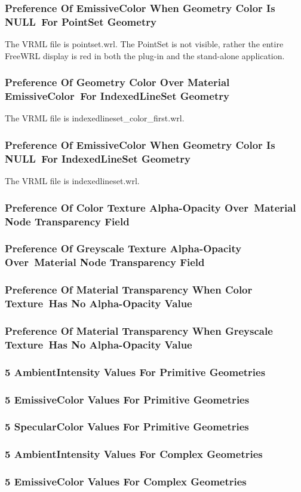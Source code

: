 \documentclass[12pt,letterpaper]{article}
\newcommand{\MatOa}{Preference Of EmissiveColor When Geometry Color Is NULL~}
\newcommand{\MatOb}{For PointSet Geometry}
\newcommand{\MatPa}{Preference Of Geometry Color Over Material EmissiveColor~}
\newcommand{\MatPb}{For IndexedLineSet Geometry}
\newcommand{\MatQa}{Preference Of EmissiveColor When Geometry Color Is NULL~}
\newcommand{\MatQb}{For IndexedLineSet Geometry}
\newcommand{\MatRa}{Preference Of Color Texture Alpha-Opacity Over~}
\newcommand{\MatRb}{Material Node Transparency Field}
\newcommand{\MatSa}{Preference Of Greyscale Texture Alpha-Opacity Over~}
\newcommand{\MatSb}{Material Node Transparency Field}
\newcommand{\MatTa}{Preference Of Material Transparency When Color Texture~}
\newcommand{\MatTb}{Has No Alpha-Opacity Value}
\newcommand{\MatUa}{Preference Of Material Transparency When Greyscale Texture~}
\newcommand{\MatUb}{Has No Alpha-Opacity Value}
\newcommand{\MatV}{5 AmbientIntensity Values For Primitive Geometries}
\newcommand{\MatW}{5 EmissiveColor Values For Primitive Geometries}
\newcommand{\MatX}{5 SpecularColor Values For Primitive Geometries}
\newcommand{\MatY}{5 AmbientIntensity Values For Complex Geometries}
\newcommand{\MatZ}{5 EmissiveColor Values For Complex Geometries}
\begin{document}
\subsubsection{\MatOa \MatOb}
The VRML file is pointset.wrl.\newline
The PointSet is not visible, rather the entire FreeWRL display is red in
both the plug-in and the stand-alone application.

\subsubsection{\MatPa \MatPb}
The VRML file is indexedlineset\_color\_first.wrl.

\subsubsection{\MatQa \MatQb}
The VRML file is indexedlineset.wrl.

\subsubsection{\MatRa \MatRb}
\subsubsection{\MatSa \MatSb}
\subsubsection{\MatTa \MatTb}
\subsubsection{\MatUa \MatUb}
\subsubsection{\MatV}
\subsubsection{\MatW}
\subsubsection{\MatX}
\subsubsection{\MatY}
\subsubsection{\MatZ}
\end{document}
